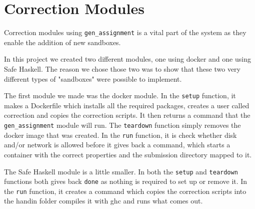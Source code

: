 \chapter{Correction Modules}
Correction modules using \texttt{gen\_assignment} is a vital part of the system
as they enable the addition of new sandboxes.

In this project we created two different modules, one using docker and one using
Safe Haskell. The reason we chose those two was to show that these two very
different types of "sandboxes" were possible to implement.

The first module we made was the docker module. In the \texttt{setup} function,
it makes a Dockerfile which installs all the required packages, creates a user
called correction and copies the correction scripts. It then returns a command
that the \texttt{gen\_assignment} module will run.
The \texttt{teardown} function simply removes the docker image that was created.
In the \texttt{run} function, it is check whether disk and/or network is allowed
before it gives back a command, which starts a container with the correct
properties and the submission directory mapped to it.


The Safe Haskell module is a little smaller. In both the \texttt{setup} and
\texttt{teardown} functions both gives back \texttt{done} as nothing is required
to set up or remove it. In the \texttt{run} function, it creates a command which
copies the correction scripts into the handin folder compiles it with ghc and
runs what comes out.

